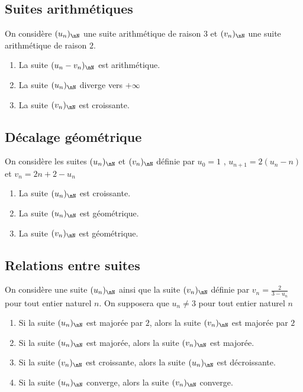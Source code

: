 \documentclass[oneside,12pt]{article}
\begin{document}
\subsection{Suites arithmétiques}
On considère $(u_n)_{\nN}$ une suite arithmétique de raison $3$ et $(v_n)_{\nN}$ une suite arithmétique de raison $2$.
\begin{enumerate}
	\item La suite $(u_n - v_n)_{\nN}$ est arithmétique.
	\item La suite $(u_n)_{\nN}$ diverge vers $+\infty$
	\item La suite $(v_n)_{\nN}$ est croissante.
\end{enumerate}



\subsection{Décalage géométrique}
On considère les suites $(u_n)_{\nN}$ et $(v_n)_{\nN}$ définie par $u_0=1$ , $u_{n+1}=2(u_n-n)$ et $v_n=2n+2-u_n$
\begin{enumerate}
	\item La suite $(u_n)_{\nN}$ est croissante.
	\item La suite $(u_n)_{\nN}$ est géométrique.
	\item La suite $(v_n)_{\nN}$ est géométrique.
\end{enumerate}



\subsection{Relations entre suites}
On considère une suite $(u_n)_{\nN}$ ainsi que la suite $(v_n)_{\nN}$ définie par $v_n=\frac{2}{3-u_n}$ pour tout entier naturel $n$. On supposera que $u_n\neq3$ pour tout entier naturel $n$
\begin{enumerate}
	\item Si la suite $(u_n)_{\nN}$ est majorée par $2$, alors la suite $(v_n)_{\nN}$ est majorée par $2$
	\item Si la suite $(u_n)_{\nN}$ est majorée, alors la suite $(v_n)_{\nN}$ est majorée.
	\item Si la suite $(v_n)_{\nN}$ est croissante, alors la suite $(u_n)_{\nN}$ est décroissante.
	\item Si la suite $(u_n)_{\nN}$ converge, alors la suite $(v_n)_{\nN}$ converge.
\end{enumerate}
\end{document}
